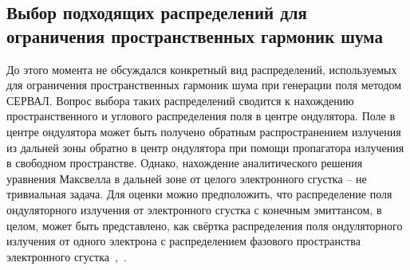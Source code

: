 \subsection{Выбор подходящих распределений для ограничения пространственных гармоник шума}
До этого момента не обсуждался конкретный вид распределений, используемых для ограничения пространственных гармоник шума при генерации поля методом СЕРВАЛ. Вопрос выбора таких распределений сводится к нахождению пространственного и углового распределения поля в центре ондулятора. Поле в центре ондулятора может быть получено обратным распространением излучения из дальней зоны обратно в центр ондулятора при помощи пропагатора излучения в свободном пространстве. Однако, нахождение аналитического решения уравнения Максвелла в дальней зоне от целого электронного сгустка -- не тривиальная задача. Для оценки можно предположить, что распределение поля ондуляторного излучения от электронного сгустка с конечным эмиттансом, в целом, может быть представлено, как свёртка распределения поля ондуляторного излучения от одного электрона с распределением фазового пространства электронного сгустка~\cite{geloni_transverse_2008},~\cite{chubar_simulation_2006}.


